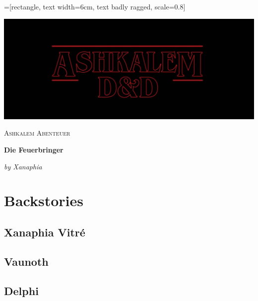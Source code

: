 \documentclass[10pt,twoside,openany]{book}
\begin{document}
	=[rectangle, text width=6cm, text badly ragged, scale=0.8]
		
		\centering
		\includegraphics[width=1\textwidth]{AshkalemLogo}\par\vspace{1cm}
		{\scshape\LARGE Ashkalem Abenteuer \par}
		\vspace{1cm}
		{\huge\bfseries Die Feuerbringer \par}
		\vspace{2cm}
		{\Large\itshape by Xanaphia \par}
		
		\vfill
		
		
	\twocolumn
	\tableofcontents %
	\newpage %
	
	\chapter{Backstories}
	
	\section{Xanaphia Vitré}
	
	
	\section{Vaunoth}
	
	\section{Delphi}
	
\end{document}
